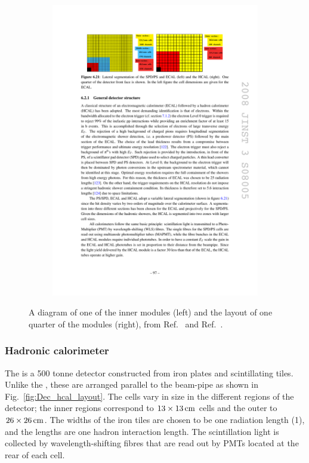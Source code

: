 \begin{figure}[!h]
\begin{subfigure}[t]{0.4\textwidth}
        \includegraphics[width=1.0\textwidth]{figs/Detector/ecal_layout.pdf}
    \end{subfigure}
    \caption{A diagram of one of the inner \ecal modules (left) and the layout of one quarter of the \ecal modules (right), from Ref.~\cite{Alves:2008zz} and Ref.~\cite{doi:1765047}.}
    \label{fig:Dec_ecal_layout}   
\end{figure}


\subsubsection{Hadronic calorimeter}

The \hcal is a 500 tonne detector constructed from iron plates and scintillating tiles. Unlike the \ecal, these are arranged parallel to the beam-pipe as shown in Fig.~\ref{fig:Dec_hcal_layout}. The cells vary in size in the different regions of the detector; the inner regions correspond to $13 \times 13 \mathrm{ \,cm}$ cells and the outer to $26\times26\mathrm{ \,cm}$. The widths of the iron tiles are chosen to be one radiation length (1\cm), and the lengths are one hadron interaction length. The scintillation light is collected by wavelength-shifting fibres that are read out by PMTs located at the rear of each cell.    


